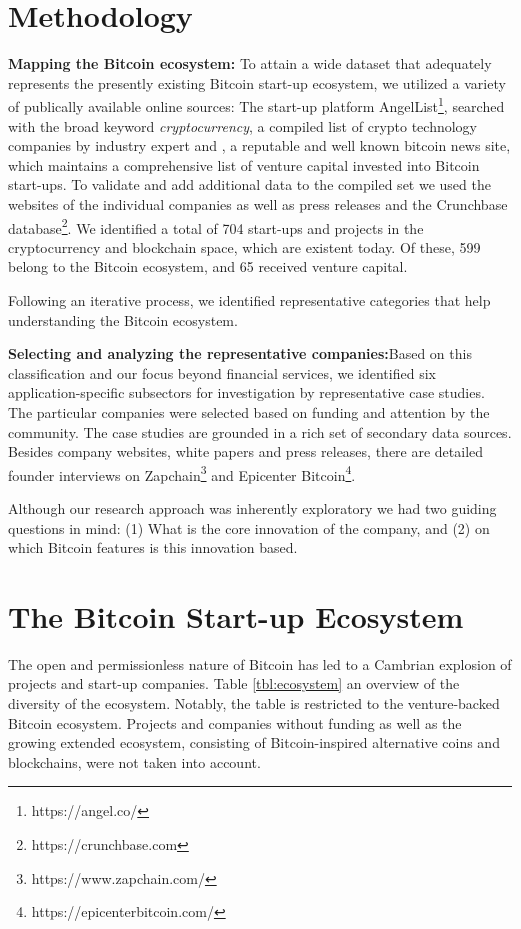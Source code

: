 \section{Methodology}
\label{sec:eco:method}

\textbf{Mapping the Bitcoin ecosystem:} To attain a wide dataset that adequately 
represents the presently existing Bitcoin start-up ecosystem, we utilized a variety 
of publically available online sources: The start-up platform AngelList\footnote{https://angel.co/}, 
searched with the broad keyword \emph{cryptocurrency}, a compiled list of crypto technology 
companies by industry expert \cite{Mougayar2015} and \cite{Coindesk2015}, a reputable 
and well known bitcoin news site, which maintains a comprehensive list of venture 
capital invested into Bitcoin start-ups. To validate and add additional data to 
the compiled set we used the websites of the individual companies as well as press 
releases and the Crunchbase database\footnote{https://crunchbase.com}. We identified a total of 704 start-ups 
and projects in the cryptocurrency and blockchain space, which are existent today. 
Of these, 599 belong to the Bitcoin ecosystem, and 65 received venture capital. 

Following an iterative process, we identified representative categories that help 
understanding the Bitcoin ecosystem. 

\textbf{Selecting and analyzing the representative companies:}Based on this classification 
and our focus beyond financial services, we identified six application-specific 
subsectors for investigation by representative case studies. The particular companies 
were selected based on funding and attention by the community. The case studies 
are grounded in a rich set of secondary data sources. Besides company websites, 
white papers and press releases, there are detailed founder interviews on Zapchain\footnote{https://www.zapchain.com/} and Epicenter Bitcoin\footnote{https://epicenterbitcoin.com/}. 

Although our research approach was inherently exploratory we had two guiding questions 
in mind: (1) What is the core innovation of the company, and (2) on which Bitcoin 
features is this innovation based.

\section{The Bitcoin Start-up Ecosystem}
\label{sec:sec:eco}

The open and permissionless nature of Bitcoin has led to a Cambrian explosion of 
projects and start-up companies. Table \ref{tbl:ecosystem} an overview of the diversity 
of the ecosystem. Notably, the table is restricted to the venture-backed Bitcoin 
ecosystem. Projects and companies without funding as well as the growing extended 
ecosystem, consisting of Bitcoin-inspired alternative coins and blockchains, were 
not taken into account. 


